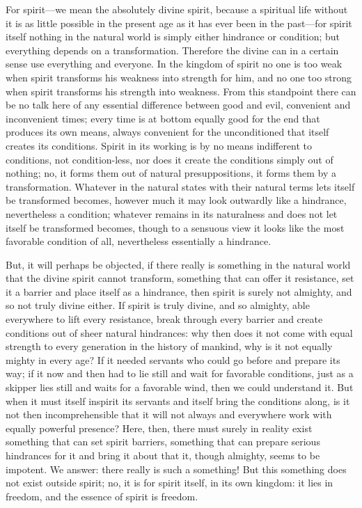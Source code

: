 \documentclass[12pt]{book}
\newcommand{\opage}[1]{\marginnote{\footnotesize\textit{[#1]}}}
\begin{document}
For spirit---we mean the absolutely divine spirit, because a spiritual
life without it is as little possible in the present age as it has ever
been in the past---for spirit itself nothing in the natural
\opage{8}\setcounter{footnote}{0}%
world is simply either hindrance or condition; but everything depends
on a transformation. Therefore the divine can in a certain sense use
everything and everyone. In the kingdom of spirit no one is too weak
when spirit transforms his weakness into strength for him, and no one
too strong when spirit transforms his strength into weakness. From this
standpoint there can be no talk here of any essential difference between
good and evil, convenient and inconvenient times; every time is at
bottom equally good for the end that produces its own means, always
convenient for the unconditioned that itself creates its conditions.
Spirit in its working is by no means indifferent to conditions, not
condition-less, nor does it create the conditions simply out of nothing;
no, it forms them out of natural presuppositions, it forms them by a
transformation. Whatever in the natural states with their natural terms
lets itself be transformed becomes, however much it may look outwardly
like a hindrance, nevertheless a condition; whatever remains in its
naturalness and does not let itself be transformed becomes, though to a
sensuous view it looks like the most favorable condition of all,
nevertheless essentially a hindrance.

But, it will perhaps be objected, if there really is something in the
natural world that the divine spirit cannot transform, something that
can offer it resistance, set it a barrier and place itself as a
hindrance, then spirit is surely not almighty, and so not truly divine
either. If spirit is truly divine, and so almighty, able everywhere to
lift every resistance, break through every barrier and create conditions
out of sheer natural hindrances: why then does it not come with equal
strength to every generation in the history of mankind, why is it not
equally mighty in every age? If it needed servants who
\opage{9}\setcounter{footnote}{0}%
could go before and prepare its way; if it now and then had to lie still
and wait for favorable conditions, just as a skipper lies still and
waits for a favorable wind, then we could understand it. But when it
must itself inspirit its servants and itself bring the conditions along,
is it not then incomprehensible that it will not always and everywhere
work with equally powerful presence? Here, then, there must surely in
reality exist something that can set spirit barriers, something that can
prepare serious hindrances for it and bring it about that it, though
almighty, seems to be impotent. We answer: there really is such a
something! But this something does not exist outside spirit; no, it is
for spirit itself, in its own kingdom: it lies in freedom, and the
essence of spirit is freedom.
\end{document}
